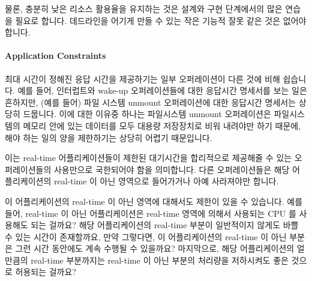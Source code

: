 물론, 충분히 낮은 리소스 활용율을 유지하는 것은 설계와 구현 단계에서의 많은
연습을 필요로 합니다.
데드라인을 어기게 만들 수 있는 작은 기능적 잘못 같은 것은 없어야 합니다.

\paragraph{Application Constraints}
\label{sec:advsync:Application Constraints}

최대 시간이 정해진 응답 시간을 제공하기는 일부 오퍼레이션이 다른 것에 비해
쉽습니다.
예를 들어, 인터럽트와 wake-up 오퍼레이션들에 대한 응답시간 명세서를 보는 일은
흔하지만, (예를 들어) 파일 시스템 unmount 오퍼레이션에 대한 응답시간 명세서는
상당히 드뭅니다.
이에 대한 이유중 하나는 파일시스템 unmount 오퍼레이션은 파일시스템의 메모리
안에 있는 데이터를 모두 대용량 저장장치로 비워 내려야만 하기 때문에, 해야 하는
일의 양을 제한하기는 상당히 어렵기 때문입니다.

이는 real-time 어플리케이션들이 제한된 대기시간을 합리적으로 제공해줄 수 있는
오퍼레이션들의 사용만으로 국한되어야 함을 의미합니다.
다른 오퍼레이션들은 해당 어플리케이션의 real-time 이 아닌 영역으로 들어가거나
아예 사라져야만 합니다.

이 어플리케이션의 real-time 이 아닌 영역에 대해서도 제한이 있을 수 있습니다.
예를 들어, real-time 이 아닌 어플리케이션은 real-time 영역에 의해서 사용되는
CPU 를 사용해도 되는 걸까요?
해당 어플리케이션의 real-time 부분이 일반적이지 않게도 바쁠 수 있는 시간이
존재할까요, 만약 그렇다면, 이 어플리케이션의 real-time 이 아닌 부분은 그런 시간
동안에도 계속 수행될 수 있을까요?
마지막으로, 해당 어플리케이션의 얼만큼의 real-time 부분까지는 real-time 이 아닌
부분의 처리량을 저하시켜도 좋은 것으로 허용되는 걸까요?
\iffalse

